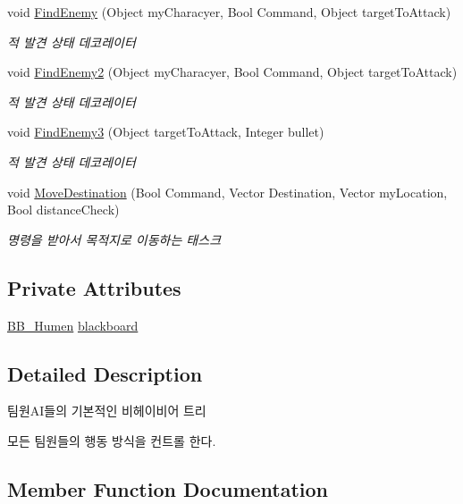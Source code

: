 \begin{DoxyCompactItemize}
void \hyperlink{class_b_t___base_aae303238f1a4876a0dc077a91c25b57f}{Find\+Enemy} (Object my\+Characyer, Bool Command, Object target\+To\+Attack)
\begin{DoxyCompactList}\small\item\em 적 발견 상태 데코레이터 \end{DoxyCompactList}\item 
void \hyperlink{class_b_t___base_a69b8c8c1711027633033b4c7e04e973b}{Find\+Enemy2} (Object my\+Characyer, Bool Command, Object target\+To\+Attack)
\begin{DoxyCompactList}\small\item\em 적 발견 상태 데코레이터 \end{DoxyCompactList}\item 
void \hyperlink{class_b_t___base_a2467b31b837f61678c1c6a9527289205}{Find\+Enemy3} (Object target\+To\+Attack, Integer bullet)
\begin{DoxyCompactList}\small\item\em 적 발견 상태 데코레이터 \end{DoxyCompactList}\item 
void \hyperlink{class_b_t___base_abef18c6b5c690579ef40316937626191}{Move\+Destination} (Bool Command, Vector Destination, Vector my\+Location, Bool distance\+Check)
\begin{DoxyCompactList}\small\item\em 명령을 받아서 목적지로 이동하는 태스크 \end{DoxyCompactList}\end{DoxyCompactItemize}
\subsection*{Private Attributes}
\begin{DoxyCompactItemize}
\item 
\hyperlink{class_b_b___humen}{B\+B\+\_\+\+Humen} \hyperlink{class_b_t___base_ad6873a8492447b0b9d0eef5b28032a9d}{blackboard}
\end{DoxyCompactItemize}


\subsection{Detailed Description}
팀원\+A\+I들의 기본적인 비헤이비어 트리 

모든 팀원들의 행동 방식을 컨트롤 한다. 

\subsection{Member Function Documentation}
